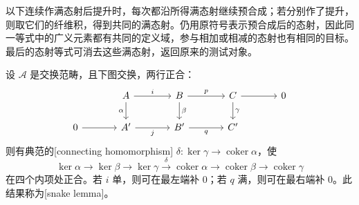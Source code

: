 \ProseParagraphBreak
以下连续作满态射后提升时，每次都沿所得满态射继续预合成；若分别作了提升，则取它们的纤维积，得到共同的满态射。仍用原符号表示预合成后的态射，因此同一等式中的广义元素都有共同的定义域，参与相加或相减的态射也有相同的目标。最后的态射等式可消去这些满态射，返回原来的测试对象。

\begin{theorem}[蛇引理]\label{b4:thm:snake-lemma}
	设 \(\mathcal A\) 是交换范畴，且下图交换，两行正合：
	\[
		\begin{tikzcd}[column sep=large]
			&A\arrow[r,"i"]\arrow[d,"\alpha"']&B\arrow[r,"p"]\arrow[d,"\beta"]&C\arrow[r]\arrow[d,"\gamma"]&0\\
			0\arrow[r]&A'\arrow[r,"j"']&B'\arrow[r,"q"']&C'&
		\end{tikzcd}
	\]
	则有典范的[connecting homomorphism] \(\delta:\ker\gamma\to\operatorname{coker}\alpha\)，使
	\[
		\ker\alpha\longrightarrow\ker\beta\longrightarrow\ker\gamma \xrightarrow{\delta}\operatorname{coker}\alpha \longrightarrow\operatorname{coker}\beta \longrightarrow\operatorname{coker}\gamma
	\]
	在四个内项处正合。若 \(i\) 单，则可在最左端补 \(0\)；若 \(q\) 满，则可在最右端补 \(0\)。此结果称为[snake lemma]。
\end{theorem}
